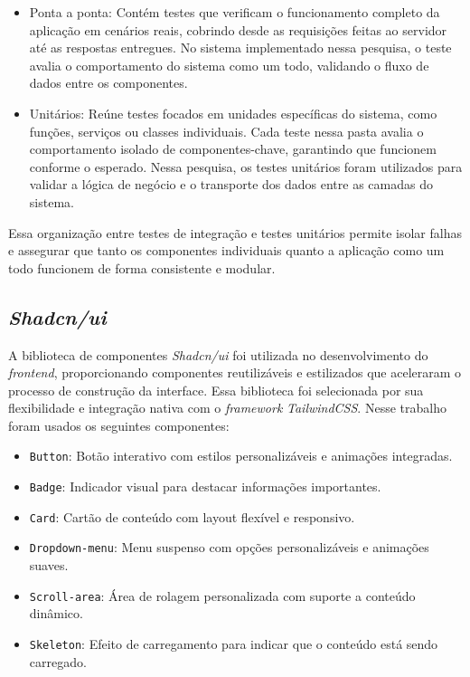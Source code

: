 \begin{itemize}
  \item Ponta a ponta: Contém testes que verificam o funcionamento completo da aplicação em cenários reais, cobrindo desde as requisições feitas ao servidor até as respostas entregues. No sistema implementado nessa pesquisa, o teste avalia o comportamento do sistema como um todo, validando o fluxo de dados entre os componentes.
  \item Unitários: Reúne testes focados em unidades específicas do sistema, como funções, serviços ou classes individuais. Cada teste nessa pasta avalia o comportamento isolado de componentes-chave, garantindo que funcionem conforme o esperado. Nessa pesquisa, os testes unitários foram utilizados para validar a lógica de negócio e o transporte dos dados entre as camadas do sistema.
\end{itemize}

Essa organização entre testes de integração e testes unitários permite isolar falhas e assegurar que tanto os componentes individuais quanto a aplicação como um todo funcionem de forma consistente e modular.

\subsection{\textit{Shadcn/ui}}
A biblioteca de componentes \textit{Shadcn/ui} foi utilizada no desenvolvimento do \textit{frontend}, proporcionando componentes reutilizáveis e estilizados que aceleraram o processo de construção da interface. Essa biblioteca foi selecionada por sua flexibilidade e integração nativa com o \textit{framework} \textit{TailwindCSS}. Nesse trabalho foram usados os seguintes componentes:
\begin{itemize}
  \item \texttt{Button}: Botão interativo com estilos personalizáveis e animações integradas.
  \item \texttt{Badge}: Indicador visual para destacar informações importantes.
  \item \texttt{Card}: Cartão de conteúdo com layout flexível e responsivo.
  \item \texttt{Dropdown-menu}: Menu suspenso com opções personalizáveis e animações suaves.
  \item \texttt{Scroll-area}: Área de rolagem personalizada com suporte a conteúdo dinâmico.
  \item \texttt{Skeleton}: Efeito de carregamento para indicar que o conteúdo está sendo carregado.
\end{itemize}


